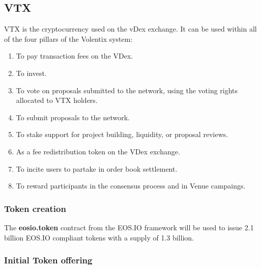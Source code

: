 \documentclass[]{article}
\begin{document}
\subsection{VTX}
VTX is the cryptocurrency used on the vDex exchange. 
It can be used within all of the four pillars of the Volentix system:
\begin{enumerate}
\item To pay transaction fees on the VDex.
\item To invest. 
\item To vote on proposals submitted to the network, using the voting rights allocated to VTX holders.
\item To submit proposals to the network.
\item To stake support for project building, liquidity, or proposal reviews. 
\item As a fee redistribution token on the VDex exchange.
\item To incite users to partake in order book settlement.
\item To reward participants in the consensus process and in Venue campaings.
\end{enumerate}



\subsubsection{Token creation}
The \textbf{eosio.token} contract from the EOS.IO framework will be used to issue 2.1 billion EOS.IO compliant tokens 
with a supply of 1.3 billion.
 
 
\subsubsection{Initial Token offering}
 
\end{document}
